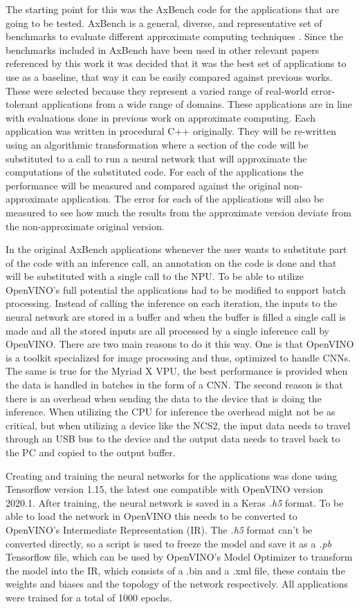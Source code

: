The starting point for this was the AxBench code for the applications that are going to be tested. AxBench is a general, diverse, and representative  set of benchmarks to evaluate different approximate computing techniques \cite{Yazdanbakhsh2016}. Since the benchmarks included in AxBench have been used in other relevant papers referenced by this work it was decided that it was the best set of applications to use as a baseline, that way it can be easily compared against previous works. These were selected because they represent a varied range of real-world error-tolerant applications from a wide range of domains. These applications are in line with evaluations done in previous work on approximate computing. Each application was written in procedural C++ originally. They will be re-written using an algorithmic transformation where a section of the code will be substituted to a call to run a neural network that will approximate the computations of the substituted code. For each of the applications the performance will be measured and compared against the original non-approximate application. The error for each of the applications will also be measured to see how much the results from the approximate version deviate from the non-approximate original version.

In the original AxBench applications whenever the user wants to substitute part of the code with an inference call, an annotation on the code is done and that will be substituted with a single call to the NPU. To be able to utilize OpenVINO's full potential the applications had to be modified to support batch processing. Instead of calling the inference on each iteration, the inputs to the neural network are stored in a buffer and when the buffer is filled a single call is made and all the stored inputs are all processed by a single inference call by OpenVINO. There are two main reasons to do it this way. One is that OpenVINO is a toolkit specialized for image processing and thus, optimized to handle CNNs. The same is true for the Myriad X VPU, the best performance is provided when the data is handled in batches in the form of a CNN. The second reason is that there is an overhead when sending the data to the device that is doing the inference. When utilizing the CPU for inference the overhead might not be as critical, but when utilizing a device like the NCS2, the input data needs to travel through an USB bus to the device and the output data needs to travel back to the PC and copied to the output buffer.

Creating and training the neural networks for the applications was done using Tensorflow version 1.15, the latest one compatible with OpenVINO version 2020.1. After training, the neural network is saved in a Keras \textit{.h5} format. To be able to load the network in OpenVINO this needs to be converted to OpenVINO's Intermediate Representation (IR). The \textit{.h5} format can't be converted directly, so a script is used to freeze the model and save it as a \textit{.pb} Tensorflow file, which can be used by OpenVINO's Model Optimizer to transform the model into the IR, which consists of a .bin and a .xml file, these contain the weights and biases and the topology of the network respectively. All applications were trained for a total of 1000 epochs.

